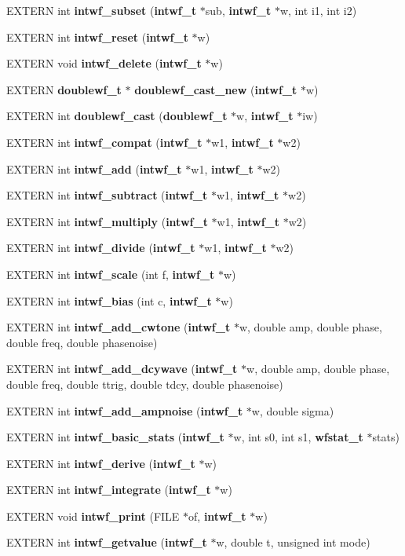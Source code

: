 \begin{CompactItemize}
EXTERN int {\bf intwf\_\-subset} ({\bf intwf\_\-t} $\ast$sub, {\bf intwf\_\-t} $\ast$w, int i1, int i2)
\item 
EXTERN int {\bf intwf\_\-reset} ({\bf intwf\_\-t} $\ast$w)
\item 
EXTERN void {\bf intwf\_\-delete} ({\bf intwf\_\-t} $\ast$w)
\item 
EXTERN {\bf doublewf\_\-t} $\ast$ {\bf doublewf\_\-cast\_\-new} ({\bf intwf\_\-t} $\ast$w)
\item 
EXTERN int {\bf doublewf\_\-cast} ({\bf doublewf\_\-t} $\ast$w, {\bf intwf\_\-t} $\ast$iw)
\item 
EXTERN int {\bf intwf\_\-compat} ({\bf intwf\_\-t} $\ast$w1, {\bf intwf\_\-t} $\ast$w2)
\item 
EXTERN int {\bf intwf\_\-add} ({\bf intwf\_\-t} $\ast$w1, {\bf intwf\_\-t} $\ast$w2)
\item 
EXTERN int {\bf intwf\_\-subtract} ({\bf intwf\_\-t} $\ast$w1, {\bf intwf\_\-t} $\ast$w2)
\item 
EXTERN int {\bf intwf\_\-multiply} ({\bf intwf\_\-t} $\ast$w1, {\bf intwf\_\-t} $\ast$w2)
\item 
EXTERN int {\bf intwf\_\-divide} ({\bf intwf\_\-t} $\ast$w1, {\bf intwf\_\-t} $\ast$w2)
\item 
EXTERN int {\bf intwf\_\-scale} (int f, {\bf intwf\_\-t} $\ast$w)
\item 
EXTERN int {\bf intwf\_\-bias} (int c, {\bf intwf\_\-t} $\ast$w)
\item 
EXTERN int {\bf intwf\_\-add\_\-cwtone} ({\bf intwf\_\-t} $\ast$w, double amp, double phase, double freq, double phasenoise)
\item 
EXTERN int {\bf intwf\_\-add\_\-dcywave} ({\bf intwf\_\-t} $\ast$w, double amp, double phase, double freq, double ttrig, double tdcy, double phasenoise)
\item 
EXTERN int {\bf intwf\_\-add\_\-ampnoise} ({\bf intwf\_\-t} $\ast$w, double sigma)
\item 
EXTERN int {\bf intwf\_\-basic\_\-stats} ({\bf intwf\_\-t} $\ast$w, int s0, int s1, {\bf wfstat\_\-t} $\ast$stats)
\item 
EXTERN int {\bf intwf\_\-derive} ({\bf intwf\_\-t} $\ast$w)
\item 
EXTERN int {\bf intwf\_\-integrate} ({\bf intwf\_\-t} $\ast$w)
\item 
EXTERN void {\bf intwf\_\-print} (FILE $\ast$of, {\bf intwf\_\-t} $\ast$w)
\item 
EXTERN int {\bf intwf\_\-getvalue} ({\bf intwf\_\-t} $\ast$w, double t, unsigned int mode)

\end{CompactItemize}
